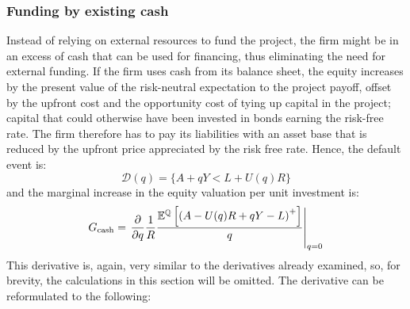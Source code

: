 \documentclass[../main.tex]{subfiles}
\begin{document}
    \subsubsection{Funding by existing cash}
        Instead of relying on external resources to fund the project,
        the firm might be in an excess of cash that can be used for financing,
        thus eliminating the need for external funding.
        If the firm uses cash from its balance sheet, the equity increases
        by the present value of the risk-neutral expectation to the project payoff,
        offset by the upfront cost and the opportunity cost of tying up capital in the project;
        capital that could otherwise have been invested in bonds earning the risk-free rate.
        The firm therefore has to pay its liabilities with an asset base that is
        reduced by the upfront price appreciated by the risk free rate.
        Hence, the default event is:
            \begin{equation*}
                \mathcal{D}(q)
                = 
                \{
                    A + qY < L + U(q)R
                \}
            \end{equation*}
        and the marginal increase in the equity valuation per unit investment is:
            \begin{equation*}
                G_{\text{cash}} =
                    \left.
                    \frac{\partial }{\partial q} 
                    \frac{1}{R}
                    \frac{
                        \mathbb{E}^{\mathbb{Q}}\left[
                            \left(
                                A - U(q)R + qY - L
                            \right)^{+}
                        \right] 
                    }{
                        q
                    } 
                    \right\rvert_{q=0}
            \end{equation*}
        This derivative is, again, very similar to the derivatives already examined,
        so, for brevity, the calculations in this section will be omitted.
        The derivative can be reformulated to the following:
\end{document}
